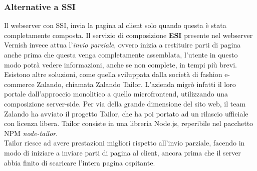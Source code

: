 \subsubsection{Alternative a SSI}
Il webserver con SSI, invia la pagina al client solo quando questa è stata completamente composta.
Il servizio di composizione \textbf{ESI} presente nel webserver Vernish invece attua l'\emph{invio parziale},
 ovvero inizia a restituire parti di pagina anche prima che questa venga completamente assemblata, 
 l'utente in questo modo potrà vedere informazioni, anche se non complete, in tempi più brevi.
\\
Esistono altre soluzioni, come quella sviluppata dalla società di fashion e-commerce Zalando, chiamata Zalando Tailor.
L'azienda migrò infatti il loro portale dall'approccio monolitico a quello microfrontend, utilizzando una composizione
server-side. Per via della grande dimensione del sito web, il team Zalando ha avviato il progetto Tailor, che ha poi portato ad un rilascio 
ufficiale con licenza libera. Tailor consiste in una libreria Node.js, reperibile nel pacchetto NPM \emph{node-tailor}.
\\Tailor riesce ad avere prestazioni migliori rispetto all'invio parziale, facendo in modo di iniziare a inviare parti di pagina al client,
ancora prima che il server abbia finito di scaricare l'intera pagina ospitante.

\pagebreak
